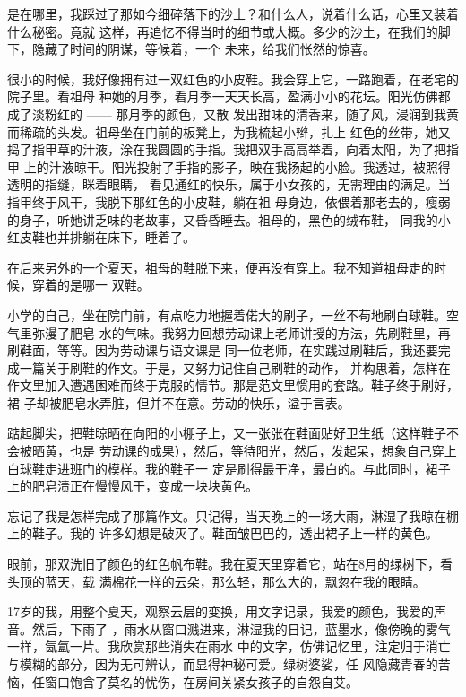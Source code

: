 \documentclass[12pt,a4paper]{article}
\begin{document}
		是在哪里，我踩过了那如今细碎落下的沙土？和什么人，说着什么话，心里又装着什么秘密。竟就
	这样，再追忆不得当时的细节或大概。多少的沙土，在我们的脚下，隐藏了时间的阴谋，等候着，一个
	未来，给我们怅然的惊喜。


		很小的时候，我好像拥有过一双红色的小皮鞋。我会穿上它，一路跑着，在老宅的院子里。看祖母
	种她的月季，看月季一天天长高，盈满小小的花坛。阳光仿佛都成了淡粉红的 —— 那月季的颜色，又散
	发出甜味的清香来，随了风，浸润到我黄而稀疏的头发。祖母坐在门前的板凳上，为我梳起小辫，扎上
	红色的丝带，她又捣了指甲草的汁液，涂在我圆圆的手指。我把双手高高举着，向着太阳，为了把指甲
	上的汁液晾干。阳光投射了手指的影子，映在我扬起的小脸。我透过，被照得透明的指缝，眯着眼睛，
	看见通红的快乐，属于小女孩的，无需理由的满足。当指甲终于风干，我脱下那红色的小皮鞋，躺在祖
	母身边，依偎着那老去的，瘦弱的身子，听她讲乏味的老故事，又昏昏睡去。祖母的，黑色的绒布鞋，
	同我的小红皮鞋也并排躺在床下，睡着了。

		在后来另外的一个夏天，祖母的鞋脱下来，便再没有穿上。我不知道祖母走的时候，穿着的是哪一
	双鞋。

		小学的自己，坐在院门前，有点吃力地握着偌大的刷子，一丝不苟地刷白球鞋。空气里弥漫了肥皂
	水的气味。我努力回想劳动课上老师讲授的方法，先刷鞋里，再刷鞋面，等等。因为劳动课与语文课是
	同一位老师，在实践过刷鞋后，我还要完成一篇关于刷鞋的作文。于是，又努力记住自己刷鞋的动作，
	并构思着，怎样在作文里加入遭遇困难而终于克服的情节。那是范文里惯用的套路。鞋子终于刷好，裙
	子却被肥皂水弄脏，但并不在意。劳动的快乐，溢于言表。

		踮起脚尖，把鞋晾晒在向阳的小棚子上，又一张张在鞋面贴好卫生纸（这样鞋子不会被晒黄，也是
	劳动课的成果），然后，等待阳光，然后，发起呆，想象自己穿上白球鞋走进班门的模样。我的鞋子一
	定是刷得最干净，最白的。与此同时，裙子上的肥皂渍正在慢慢风干，变成一块块黄色。


		忘记了我是怎样完成了那篇作文。只记得，当天晚上的一场大雨，淋湿了我晾在棚上的鞋子。我的
	许多幻想是破灭了。鞋面皱巴巴的，透出裙子上一样的黄色。

		眼前，那双洗旧了颜色的红色帆布鞋。我在夏天里穿着它，站在8月的绿树下，看头顶的蓝天，载
	满棉花一样的云朵，那么轻，那么大的，飘忽在我的眼睛。

		17岁的我，用整个夏天，观察云层的变换，用文字记录，我爱的颜色，我爱的声音。然后，下雨了
	，雨水从窗口溅进来，淋湿我的日记，蓝墨水，像傍晚的雾气一样，氤氲一片。我欣赏那些消失在雨水
	中的文字，仿佛记忆里，注定归于消亡与模糊的部分，因为无可辨认，而显得神秘可爱。绿树婆娑，任
	风隐藏青春的苦恼，任窗口饱含了莫名的忧伤，在房间关紧女孩子的自怨自艾。
\end{document}
